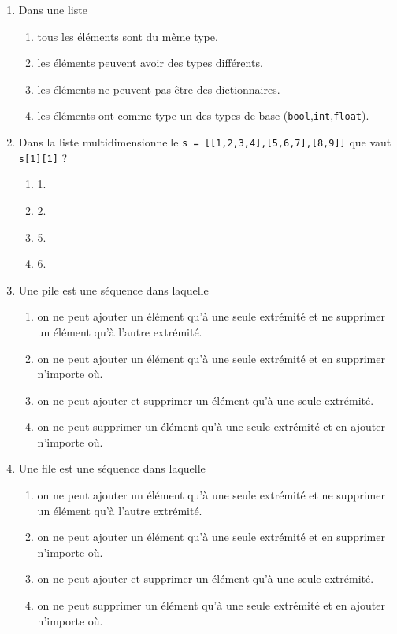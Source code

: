 \begin{td}[QCM (4)]
\begin{enumerate}
\item Dans une liste 
	\begin{enumerate}
	\item tous les éléments sont du même type.
	\item les éléments peuvent avoir des types différents.
	\item les éléments ne peuvent pas être des dictionnaires.
	\item les éléments ont comme type un des types de base ({\tt bool},{\tt int},{\tt float}).
	\end{enumerate}

\item Dans la liste multidimensionnelle {\tt s = [[1,2,3,4],[5,6,7],[8,9]]} que vaut {\tt s[1][1]} ?
	\begin{enumerate}
	\item 1.
	\item 2.
	\item 5.
	\item 6.
	\end{enumerate}

\item Une pile est une séquence dans laquelle 
	\begin{enumerate}
	\item on ne peut ajouter un élément qu'à une seule extrémité 
		et ne supprimer un élément qu'à l'autre extrémité.
	\item on ne peut ajouter un élément qu'à une seule extrémité
		et en supprimer n'importe où.
	\item on ne peut ajouter et supprimer un élément
		qu'à une seule extrémité.
	\item on ne peut supprimer un élément qu'à une seule extrémité
		et en ajouter n'importe où.
	\end{enumerate}

\item Une file est une séquence dans laquelle 
	\begin{enumerate}
	\item on ne peut ajouter un élément qu'à une seule extrémité 
		et ne supprimer un élément qu'à l'autre extrémité.
	\item on ne peut ajouter un élément qu'à une seule extrémité
		et en supprimer n'importe où.
	\item on ne peut ajouter et supprimer un élément
		qu'à une seule extrémité.
	\item on ne peut supprimer un élément qu'à une seule extrémité
		et en ajouter n'importe où.
	\end{enumerate}


\end{enumerate}
\end{td}
